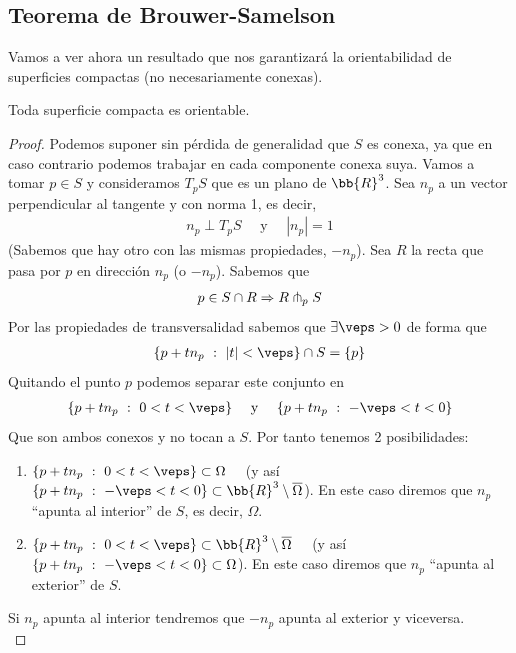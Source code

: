 \subsection{Teorema de Brouwer-Samelson}

Vamos a ver ahora un resultado que nos garantizará la orientabilidad de superficies compactas (no necesariamente conexas).

\begin{teo}\label{teo:brouwer_samelson}
    Toda superficie compacta es orientable.

    \begin{proof}
        Podemos suponer sin pérdida de generalidad que $S$ es conexa, ya que en caso contrario podemos trabajar en cada componente conexa suya.
        Vamos a tomar $p\in S$ y consideramos $T_pS$ que es un plano de $\bb{R}^3$. Sea $n_p$ a un vector perpendicular al tangente y con norma 1, es decir,
        \begin{gather*}
            n_p \perp T_pS \quad \text{ y } \quad |n_p|=1 
        \end{gather*}
        (Sabemos que hay otro con las mismas propiedades, $-n_p$). Sea $R$ la recta que pasa por $p$ en dirección $n_p$ (o $-n_p$). Sabemos que 
        \begin{gather*}
            p\in S\cap R \Rightarrow R \pitchfork_p S
        \end{gather*}
        Por las propiedades de transversalidad sabemos que $\exists \veps>0$ de forma que 
        \begin{gather*}
            \{p+tn_p \ : \ |t|<\veps\}\cap S = \{p\}
        \end{gather*}
        Quitando el punto $p$ podemos separar este conjunto en 
        \begin{gather*}
            \{p+tn_p \ : \ 0<t<\veps\} \quad \text{ y } \quad \{p+tn_p \ : \ -\veps<t<0\}
        \end{gather*}
        Que son ambos conexos y no tocan a $S$. Por tanto tenemos 2 posibilidades:
        \begin{enumerate}
            \item $\{p+tn_p \ : \ 0<t<\veps\} \subset \Omega \quad$ (y así $\{p+tn_p \ : \ -\veps<t<0\}\subset \bb{R}^3 \setminus \overline{\Omega}$). En este caso diremos que $n_p$ ``apunta al interior'' de $S$, es decir, $\Omega$.
            \item $\{p+tn_p \ : \ 0<t<\veps\} \subset \bb{R}^3 \setminus \overline{\Omega} \quad$ (y así $\{p+tn_p \ : \ -\veps<t<0\}\subset \Omega$). En este caso diremos que $n_p$ ``apunta al exterior'' de $S$.
        \end{enumerate}
        Si $n_p$ apunta al interior tendremos que $-n_p$ apunta al exterior y viceversa.\\


\end{proof}
\end{teo}
